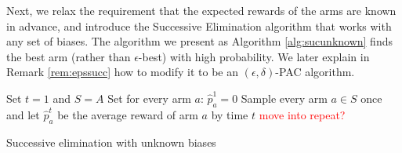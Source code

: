  Next, we relax the requirement that the expected rewards of the
arms are known in advance, and introduce the Successive Elimination
algorithm that works with any set of biases. The algorithm we
present as Algorithm \ref{alg:sucunknown} finds the best arm (rather
than $\epsilon$-best) with high probability. We later explain in Remark
\ref{rem:epssucc} how
to modify it to be an $(\epsilon,\delta)$-PAC algorithm.\\
\bigskip
\begin{algorithm}[H]
 
Set $t=1$ and $S = A$\; Set for every arm $a$: $\hat{p}_a^1 = 0$\;
Sample every arm $a \in S$ once and let
    $\hat{p}_a^t$ be the average reward of arm $a$ by time $t$ \textcolor{red}{move into repeat?} \;
\caption{Successive elimination with unknown biases \label{alg:sucunknown}}
\end{algorithm}

